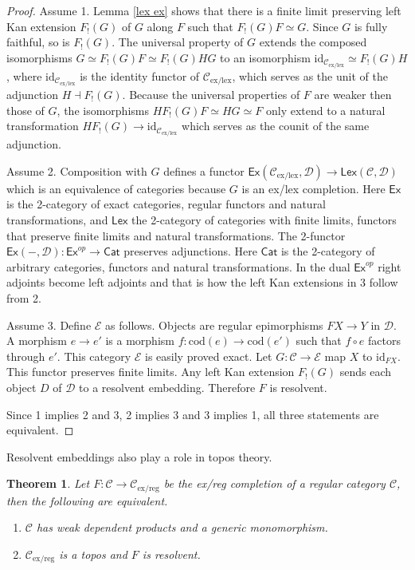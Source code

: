 \documentclass[sort&compress,draft]{elsarticle}
\theoremstyle{plain}
\newtheorem{theorem}{Theorem}
\theoremstyle{definition}
\theoremstyle{remark}
\newcommand\hide[1]{}
\newcommand\cat\mathcal
\newcommand\exlex{_\mathrm{ex/lex}}\newcommand\exreg{_\mathrm{ex/reg}}
\newcommand\of:
\newcommand\id{\mathrm{id}}
\newcommand\cod{\mathrm{cod}}
\newcommand\di{_!}
\begin{document}
\newcommand\Cat\mathsf
\newcommand\dual{^{op}}
\begin{proof} 
Assume 1. Lemma \ref{lex ex} shows that there is a finite limit preserving left Kan extension $F\di(G)$ of $G$ along $F$ such that $F\di(G)F\simeq G$. Since $G$ is fully faithful, so is $F\di(G)$. The universal property of $G$ extends the composed isomorphisms $G \simeq F\di(G)F\simeq F\di(G)HG$ to an isomorphism $\id_{\cat C\exlex}\simeq F\di(G)H$, where $\id_{\cat C\exlex}$ is the identity functor of $\cat C\exlex$, which serves as the unit of the adjunction $H \dashv F\di(G)$. Because the universal properties of $F$ are weaker then those of $G$, the isomorphisms $HF\di(G)F\simeq HG\simeq F$ only extend to a natural transformation $HF\di(G)\to \id_{\cat C\exlex}$ which serves as the counit of the same adjunction.

Assume 2. Composition with $G$ defines a functor $\Cat{Ex}(\cat C\exlex,\cat D)\to\Cat{Lex}(\cat C,\cat D)$ which is an equivalence of categories because $G$ is an ex/lex completion. Here $\Cat{Ex}$ is the 2-category of exact categories, regular functors and natural transformations, and $\Cat{Lex}$ the 2-category of categories with finite limits, functors that preserve finite limits and natural transformations. The 2-functor $\Cat{Ex}(-,\cat D)\of\Cat{Ex}\dual\to\Cat{Cat}$ preserves adjunctions. Here $\Cat{Cat}$ is the 2-category of arbitrary categories, functors and natural transformations. In the dual $\Cat{Ex}\dual$ right adjoints become left adjoints and that is how the left Kan extensions in 3 follow from 2.
\hide{Is this acceptable? Would it (not) be better to move everything to the 2-categorical level?}

Assume 3. Define $\cat E$ as follows. Objects are regular epimorphisms $FX\to Y$ in $\cat D$. A morphism $e\to e'$ is a morphism $f\of\cod(e)\to\cod(e')$
such that $f\circ e$ factors through $e'$. This category $\cat E$ is easily proved exact. Let $G\of \cat C\to\cat E$ map $X$ to $\id_{FX}$. This functor preserves finite limits. Any left Kan extension $F\di(G)$ sends each object $D$ of $\cat D$ to a resolvent embedding. Therefore $F$ is resolvent.

Since 1 implies 2 and 3, 2 implies 3 and 3 implies 1, all three statements are equivalent.
\end{proof}

Resolvent embeddings also play a role in topos theory.

\begin{theorem} Let $F:\cat C\to\cat C\exreg$ be the ex/reg completion of a regular category $\cat C$, then the following are equivalent.
\begin{enumerate}
\item $\cat C$ has \emph{weak dependent products} and a \emph{generic monomorphism}. \hide{these need to be defined somewhere}
\item $\cat C\exreg$ is a topos and $F$ is resolvent. 
\end{enumerate}
\end{theorem}
\end{document}
